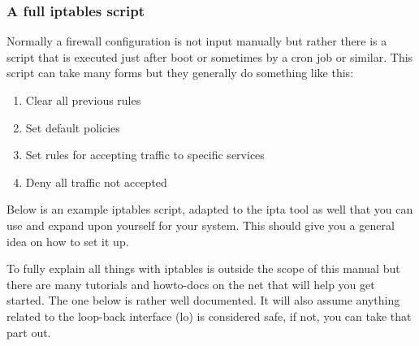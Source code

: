 \documentclass[english,twoside,openright,a4paper,12pt]{article}
\begin{document}
\subsubsection{A full iptables script}

Normally a firewall configuration is not input manually but rather there is a script that is executed just after boot or sometimes by a cron job or similar. This script can take many forms but they generally do something like this:

\begin{enumerate}
\item Clear all previous rules
\item Set default policies
\item Set rules for accepting traffic to specific services
\item Deny all traffic not accepted
\end{enumerate}


Below is an example iptables script, adapted to the ipta tool as well that you can use and expand upon yourself for your system. This should give you a general idea on how to set it up.

To fully explain all things with iptables is outside the scope of this manual but there are many tutorials and howto-docs on the net that will help you get started. The one below is rather well documented. It will also assume anything related to the loop-back interface (lo) is considered safe, if not, you can take that part out.

\small
\end{document}
